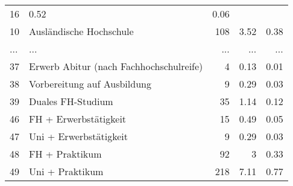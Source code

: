 \begin{longtable}{lXrrr}
          \num{16} &
          \num[round-mode=places,round-precision=2]{0.52} &
          \num[round-mode=places,round-precision=2]{0.06} \\
        10 & \multicolumn{1}{X}{Ausländische Hochschule} & %
          \num{108} &
          \num[round-mode=places,round-precision=2]{3.52} &
          \num[round-mode=places,round-precision=2]{0.38} \\
       ... & ... & ... & ... & ... \\
        37 & \multicolumn{1}{X}{Erwerb Abitur (nach Fachhochschulreife)} & %
          \num{4} &
          \num[round-mode=places,round-precision=2]{0.13} &
          \num[round-mode=places,round-precision=2]{0.01} \\

        38 & \multicolumn{1}{X}{Vorbereitung auf Ausbildung} & %
          \num{9} &
          \num[round-mode=places,round-precision=2]{0.29} &
          \num[round-mode=places,round-precision=2]{0.03} \\

        39 & \multicolumn{1}{X}{Duales FH-Studium} & %
          \num{35} &
          \num[round-mode=places,round-precision=2]{1.14} &
          \num[round-mode=places,round-precision=2]{0.12} \\

        46 & \multicolumn{1}{X}{FH + Erwerbstätigkeit} & %
          \num{15} &
          \num[round-mode=places,round-precision=2]{0.49} &
          \num[round-mode=places,round-precision=2]{0.05} \\

        47 & \multicolumn{1}{X}{Uni + Erwerbstätigkeit} & %
          \num{9} &
          \num[round-mode=places,round-precision=2]{0.29} &
          \num[round-mode=places,round-precision=2]{0.03} \\

        48 & \multicolumn{1}{X}{FH + Praktikum} & %
          \num{92} &
          \num[round-mode=places,round-precision=2]{3} &
          \num[round-mode=places,round-precision=2]{0.33} \\

        49 & \multicolumn{1}{X}{Uni + Praktikum} & %
          \num{218} &
          \num[round-mode=places,round-precision=2]{7.11} &
          \num[round-mode=places,round-precision=2]{0.77} \\


\end{longtable}
